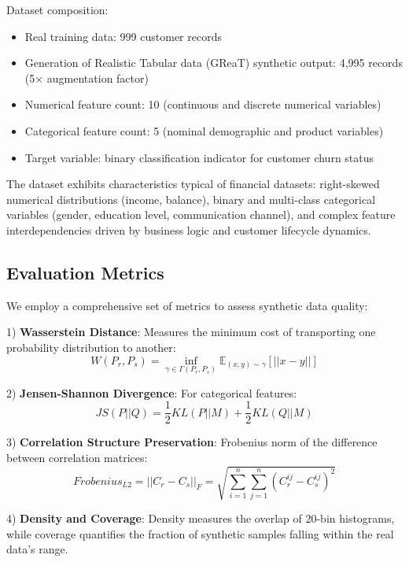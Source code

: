 \documentclass[10pt,conference,a4paper]{IEEEtran}
\begin{document}
Dataset composition:
\begin{itemize}
    \item Real training data: 999 customer records
    \item Generation of Realistic Tabular data (GReaT) synthetic output: 4,995 records (5× augmentation factor)
    \item Numerical feature count: 10 (continuous and discrete numerical variables)
    \item Categorical feature count: 5 (nominal demographic and product variables)
    \item Target variable: binary classification indicator for customer churn status
\end{itemize}

The dataset exhibits characteristics typical of financial datasets: right-skewed numerical distributions (income, balance), binary and multi-class categorical variables (gender, education level, communication channel), and complex feature interdependencies driven by business logic and customer lifecycle dynamics.

\subsection{Evaluation Metrics}
We employ a comprehensive set of metrics to assess synthetic data quality:

1) \textbf{Wasserstein Distance}: Measures the minimum cost of transporting one probability distribution to another:
\begin{equation}
W(P_{r},P_{s})=\inf_{\gamma\in\Gamma(P_{r},P_{s})}\mathbb{E}_{(x,y)\sim\gamma}[||x-y||] \label{eq:wasserstein}
\end{equation}

2) \textbf{Jensen-Shannon Divergence}: For categorical features:
\begin{equation}
JS(P||Q)=\frac{1}{2}KL(P||M)+\frac{1}{2}KL(Q||M) \label{eq:jsd}
\end{equation}

3) \textbf{Correlation Structure Preservation}: Frobenius norm of the difference between correlation matrices:
\begin{equation}
Frobenius_{L2} = ||C_r - C_s||_F = \sqrt{\sum_{i=1}^{n}\sum_{j=1}^{n}(C_{r}^{ij}-C_{s}^{ij})^{2}} \label{eq:frobenius}
\end{equation}

4) \textbf{Density and Coverage}: Density measures the overlap of 20-bin histograms, while coverage quantifies the fraction of synthetic samples falling within the real data's range.
\end{document}
